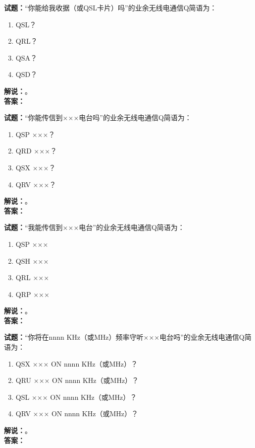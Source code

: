 \documentclass{ctexbook}
\begin{document}
\bigskip




\noindent\textbf{试题：}“你能给我收据（或QSL卡片）吗”的业余无线电通信Q简语为：
\begin{enumerate}[leftmargin=3em]
\item QSL？
\item QRL？
\item QSA？
\item QSD？
\end{enumerate}
\noindent\textbf{解说：}\textbf{}。\\\noindent\textbf{答案：}

\bigskip




\noindent\textbf{试题：}“你能传信到×××电台吗”的业余无线电通信Q简语为：
\begin{enumerate}[leftmargin=3em]
\item QSP ×××？
\item QRD ×××？
\item QSX ×××？
\item QRV ×××？
\end{enumerate}
\noindent\textbf{解说：}\textbf{}。\\\noindent\textbf{答案：}

\bigskip




\noindent\textbf{试题：}“我能传信到×××电台”的业余无线电通信Q简语为：
\begin{enumerate}[leftmargin=3em]
\item QSP ×××
\item QSH ×××
\item QRL ×××
\item QRP ×××
\end{enumerate}
\noindent\textbf{解说：}\textbf{}。\\\noindent\textbf{答案：}

\bigskip




\noindent\textbf{试题：}“你将在nnnn KHz（或\unit{\MHz}）频率守听×××电台吗”的业余无线电通信Q简语为：
\begin{enumerate}[leftmargin=3em]
\item QSX ××× ON nnnn KHz（或\unit{\MHz}）？
\item QRU ××× ON nnnn KHz（或\unit{\MHz}）？
\item QSL ××× ON nnnn KHz（或\unit{\MHz}）？
\item QRV ××× ON nnnn KHz（或\unit{\MHz}）？
\end{enumerate}
\noindent\textbf{解说：}\textbf{}。\\\noindent\textbf{答案：}
\end{document}
